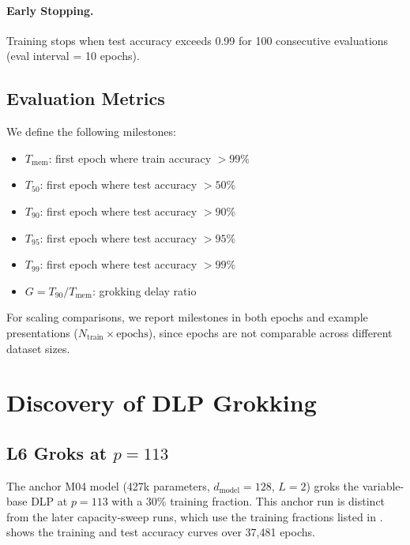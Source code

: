 \documentclass[twoside,11pt]{article}
\newcommand{\Tmem}{T_{\mathrm{mem}}}
\newcommand{\Tfifty}{T_{50}}
\newcommand{\Tninety}{T_{90}}
\newcommand{\Tninfive}{T_{95}}
\newcommand{\Tnine}{T_{99}}
\newcommand{\Gdelay}{G}
\newcommand{\dmodel}{d_{\mathrm{model}}}
\begin{document}
\paragraph{Early Stopping.} Training stops when test accuracy exceeds 0.99 for 100 consecutive evaluations (eval interval = 10 epochs).

\subsection{Evaluation Metrics}

We define the following milestones:
\begin{itemize}[leftmargin=*]
    \item $\Tmem$: first epoch where train accuracy $> 99\%$
    \item $\Tfifty$: first epoch where test accuracy $> 50\%$
    \item $\Tninety$: first epoch where test accuracy $> 90\%$
    \item $\Tninfive$: first epoch where test accuracy $> 95\%$
    \item $\Tnine$: first epoch where test accuracy $> 99\%$
    \item $\Gdelay = \Tninety / \Tmem$: grokking delay ratio
\end{itemize}

For scaling comparisons, we report milestones in both epochs and example presentations ($N_{\mathrm{train}} \times \text{epochs}$), since epochs are not comparable across different dataset sizes.



\section{Discovery of DLP Grokking}
\label{sec:discovery}

\subsection{L6 Groks at $p = 113$}

The anchor M04 model (427k parameters, $\dmodel=128$, $L=2$) groks the variable-base DLP at $p=113$ with a 30\% training fraction. This anchor run is distinct from the later capacity-sweep runs, which use the training fractions listed in .  shows the training and test accuracy curves over 37,481 epochs.
\end{document}
